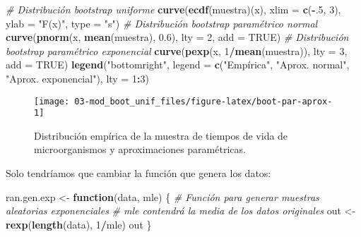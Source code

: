 \documentclass[
]{book}
\newenvironment{Shaded}{\begin{snugshade}}{\end{snugshade}}
\newcommand{\CommentTok}[1]{\textcolor[rgb]{0.56,0.35,0.01}{\textit{#1}}}
\newcommand{\ControlFlowTok}[1]{\textcolor[rgb]{0.13,0.29,0.53}{\textbf{#1}}}
\newcommand{\DataTypeTok}[1]{\textcolor[rgb]{0.13,0.29,0.53}{#1}}
\newcommand{\DecValTok}[1]{\textcolor[rgb]{0.00,0.00,0.81}{#1}}
\newcommand{\FloatTok}[1]{\textcolor[rgb]{0.00,0.00,0.81}{#1}}
\newcommand{\KeywordTok}[1]{\textcolor[rgb]{0.13,0.29,0.53}{\textbf{#1}}}
\newcommand{\NormalTok}[1]{#1}
\newcommand{\OperatorTok}[1]{\textcolor[rgb]{0.81,0.36,0.00}{\textbf{#1}}}
\newcommand{\OtherTok}[1]{\textcolor[rgb]{0.56,0.35,0.01}{#1}}
\newcommand{\StringTok}[1]{\textcolor[rgb]{0.31,0.60,0.02}{#1}}
\theoremstyle{break}
\theoremstyle{definition}
\theoremstyle{definition}
\theoremstyle{definition}
\theoremstyle{remark}
\begin{document}
\begin{Shaded}
\begin{Highlighting}[]
\CommentTok{# Distribución bootstrap uniforme}
\KeywordTok{curve}\NormalTok{(}\KeywordTok{ecdf}\NormalTok{(muestra)(x), }\DataTypeTok{xlim =} \KeywordTok{c}\NormalTok{(}\OperatorTok{-}\NormalTok{.}\DecValTok{5}\NormalTok{, }\DecValTok{3}\NormalTok{), }\DataTypeTok{ylab =} \StringTok{"F(x)"}\NormalTok{, }\DataTypeTok{type =} \StringTok{"s"}\NormalTok{)}
\CommentTok{# Distribución bootstrap paramétrico normal}
\KeywordTok{curve}\NormalTok{(}\KeywordTok{pnorm}\NormalTok{(x, }\KeywordTok{mean}\NormalTok{(muestra), }\FloatTok{0.6}\NormalTok{), }\DataTypeTok{lty =} \DecValTok{2}\NormalTok{, }\DataTypeTok{add =} \OtherTok{TRUE}\NormalTok{)}
\CommentTok{# Distribución bootstrap paramétrico exponencial}
\KeywordTok{curve}\NormalTok{(}\KeywordTok{pexp}\NormalTok{(x, }\DecValTok{1}\OperatorTok{/}\KeywordTok{mean}\NormalTok{(muestra)), }\DataTypeTok{lty =} \DecValTok{3}\NormalTok{, }\DataTypeTok{add =} \OtherTok{TRUE}\NormalTok{)}
\KeywordTok{legend}\NormalTok{(}\StringTok{"bottomright"}\NormalTok{, }\DataTypeTok{legend =} \KeywordTok{c}\NormalTok{(}\StringTok{"Empírica"}\NormalTok{, }\StringTok{"Aprox. normal"}\NormalTok{, }\StringTok{"Aprox. exponencial"}\NormalTok{), }\DataTypeTok{lty =} \DecValTok{1}\OperatorTok{:}\DecValTok{3}\NormalTok{)}
\end{Highlighting}
\end{Shaded}

\begin{figure}[!htb]

{\centering \texttt{[image: 03-mod\_boot\_unif\_files/figure-latex/boot-par-aprox-1]} 

}

\caption{Distribución empírica de la muestra de tiempos de vida de microorganismos y aproximaciones paramétricas.}\label{fig:boot-par-aprox}
\end{figure}

Solo tendríamos que cambiar la función que genera los datos:

\begin{Shaded}
\begin{Highlighting}[]
\NormalTok{ran.gen.exp <-}\StringTok{ }\ControlFlowTok{function}\NormalTok{(data, mle) \{}
    \CommentTok{# Función para generar muestras aleatorias exponenciales}
    \CommentTok{# mle contendrá la media de los datos originales}
\NormalTok{    out <-}\StringTok{ }\KeywordTok{rexp}\NormalTok{(}\KeywordTok{length}\NormalTok{(data), }\DecValTok{1}\OperatorTok{/}\NormalTok{mle)}
\NormalTok{    out}
\NormalTok{\}}
\end{Highlighting}
\end{Shaded}
\end{document}
